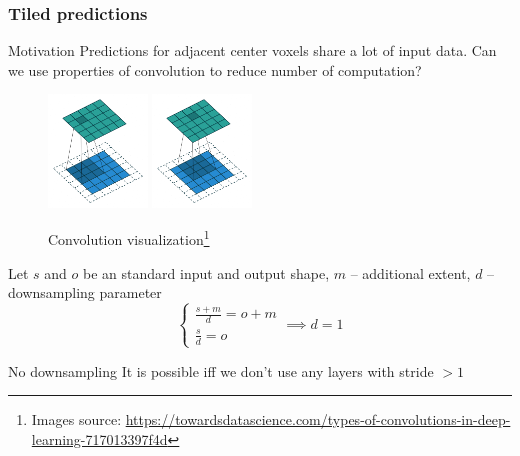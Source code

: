 \documentclass{beamer}
\begin{document}
\begin{frame}
    \frametitle{Tiled predictions}

    \begin{block}{Motivation}
        Predictions for adjacent center voxels share a lot of input data. Can we use
        properties of convolution to reduce number of computation?
    \end{block}

    \begin{minipage}{0.49\textwidth}
        \begin{figure}
            \includegraphics[height=3cm]{conv1.png}
            \includegraphics[height=3cm]{conv2.png}
            \caption{Convolution visualization\footnote{Images source: \url{https://towardsdatascience.com/types-of-convolutions-in-deep-learning-717013397f4d}}}
        \end{figure}
    \end{minipage}
    \begin{minipage}{0.49\textwidth}
        Let \( s \) and \( o \) be an standard input and output shape, \( m \) -- additional extent, \( d \) -- downsampling parameter
        \begin{equation*}
            \begin{cases}
                \frac{s + m}{d} = o + m \\
                \frac{s}{d} = o
            \end{cases}
            \implies d = 1
        \end{equation*}

        \begin{alertblock}{No downsampling}
            It is possible iff we don't use any layers with stride \( >1 \)
        \end{alertblock}
    \end{minipage}

\end{frame}
\end{document}
